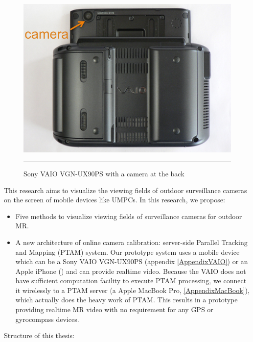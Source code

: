 \begin{figure}[htbp]
	\centering
	\includegraphics{./Primitives/vaio_back.png}
	\rule{35em}{0.5pt}
	\caption[Sony VAIO VGN-UX90PS with a camera at the back]{Sony VAIO VGN-UX90PS with a camera at the back}
	\label{fig:VAIOBack}
\end{figure}

This research aims to visualize the viewing fields of outdoor surveillance cameras on the screen of mobile devices like UMPCs. In this research, we propose:

\begin{itemize}
	\item Five methods to visualize viewing fields of surveillance cameras for outdoor MR.
	\item A new architecture of online camera calibration: server-side Parallel Tracking and Mapping (PTAM) \cite{Reference12} system. Our prototype system uses a mobile device which can be a Sony VAIO VGN-UX90PS (appendix \ref{AppendixVAIO}) or an Apple iPhone () and can provide realtime video. Because the VAIO does not have sufficient computation facility to execute PTAM processing, we connect it wirelessly to a PTAM server (a Apple MacBook Pro, \ref{AppendixMacBook}), which actually does the heavy work of PTAM. This results in a prototype providing realtime MR video with no requirement for any GPS or gyrocompass devices.
\end{itemize}

Structure of this thesis:


